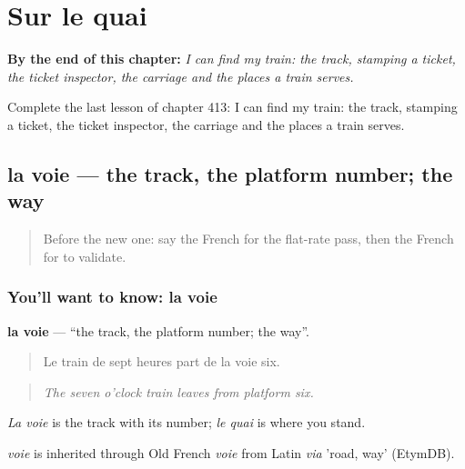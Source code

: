 
\chapter{Sur le quai}
\label{ch:fr-sur-le-quai}

\begin{chapteropening}
\textbf{By the end of this chapter:} \emph{I can find my train: the track, stamping a ticket, the ticket inspector, the carriage and the places a train serves.}

Complete the last lesson of chapter 413: I can find my train: the track, stamping a ticket, the ticket inspector, the carriage and the places a train serves.
\end{chapteropening}

\section[la voie]{la voie — the track, the platform number; the way}

\label{lesson:FR-C413-voie}



\begin{quote}
Before the new one: say the French for the flat-rate pass, then the French for to validate.
\end{quote}

\subsection*{You'll want to know: la voie}
\textbf{la voie} — \textquotedblleft{}the track, the platform number; the way\textquotedblright{}.

\begin{quote}
Le train de sept heures part de la voie six.
\end{quote}

\begin{quote}
\emph{The seven o'clock train leaves from platform six.}
\end{quote}

\emph{La voie} is the track with its number; \emph{le quai} is where you stand.

\begin{cousinweb}
\emph{voie} is inherited through Old French \emph{voie} from Latin \emph{via} 'road, way' (EtymDB).
\end{cousinweb}

